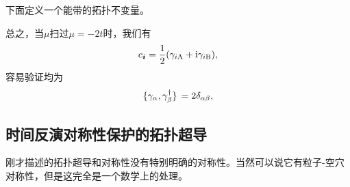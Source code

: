 下面定义一个能带的拓扑不变量。

总之，当$\mu$扫过$\mu=-2t$时，我们有
\[
    {c}_{\vb*{i}} = \frac{1}{2} ({\gamma}_{i\text{A}} + \mathrm{i} {\gamma}_{i \text{B}}),
\]
容易验证均为
\begin{equation}
    \acomm*{{\gamma}_\alpha}{{\gamma}_\beta^\dagger} = 2 \delta_{\alpha \beta},
\end{equation}

\subsection{时间反演对称性保护的拓扑超导}

刚才描述的拓扑超导和对称性没有特别明确的对称性。当然可以说它有粒子-空穴对称性，但是这完全是一个数学上的处理。
